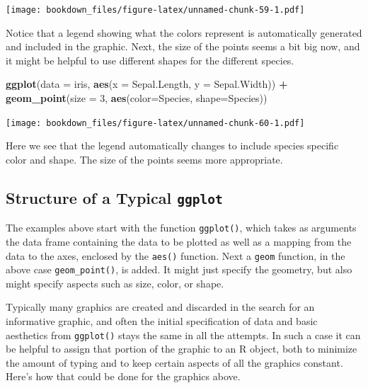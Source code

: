 \documentclass[
]{krantz}
\makeatletter
\newenvironment{Shaded}{\begin{snugshade}}{\end{snugshade}}
\newcommand{\DataTypeTok}[1]{\textcolor[rgb]{0.27,0.27,0.27}{#1}}
\newcommand{\DecValTok}[1]{\textcolor[rgb]{0.06,0.06,0.06}{#1}}
\newcommand{\KeywordTok}[1]{\textcolor[rgb]{0.27,0.27,0.27}{\textbf{#1}}}
\newcommand{\NormalTok}[1]{#1}
\newcommand{\OperatorTok}[1]{\textcolor[rgb]{0.43,0.43,0.43}{\textbf{#1}}}
\newcommand{\StringTok}[1]{\textcolor[rgb]{0.5,0.5,0.5}{#1}}
\newenvironment{kframe}{%
\medskip{}
\setlength{\fboxsep}{.8em}
 \def\at@end@of@kframe{}%
 \ifinner\ifhmode%
  \def\at@end@of@kframe{\end{minipage}}%
  \begin{minipage}{\columnwidth}%
 \fi\fi%
 \def\FrameCommand##1{\hskip\@totalleftmargin \hskip-\fboxsep
 \colorbox{shadecolor}{##1}\hskip-\fboxsep
     \hskip-\linewidth \hskip-\@totalleftmargin \hskip\columnwidth}%
 \MakeFramed {\advance\hsize-\width
   \@totalleftmargin\z@ \linewidth\hsize
   \@setminipage}}%
 {\par\unskip\endMakeFramed%
 \at@end@of@kframe}
\renewenvironment{Shaded}{\begin{kframe}}{\end{kframe}}
\makeatother
\begin{document}
\texttt{[image: bookdown\_files/figure-latex/unnamed-chunk-59-1.pdf]}

Notice that a legend showing what the colors represent is automatically generated and included in the graphic. Next, the size of the points seems a bit big now, and it might be helpful to use different shapes for the different species.

\begin{Shaded}
\begin{Highlighting}[]
\KeywordTok{ggplot}\NormalTok{(}\DataTypeTok{data =}\NormalTok{ iris, }\KeywordTok{aes}\NormalTok{(}\DataTypeTok{x =}\NormalTok{ Sepal.Length, }\DataTypeTok{y =}\NormalTok{ Sepal.Width)) }\OperatorTok{+}\StringTok{ }
\StringTok{    }\KeywordTok{geom\_point}\NormalTok{(}\DataTypeTok{size =} \DecValTok{3}\NormalTok{, }\KeywordTok{aes}\NormalTok{(}\DataTypeTok{color=}\NormalTok{Species, }\DataTypeTok{shape=}\NormalTok{Species))}
\end{Highlighting}
\end{Shaded}

\texttt{[image: bookdown\_files/figure-latex/unnamed-chunk-60-1.pdf]}

Here we see that the legend automatically changes to include species specific color and shape. The size of the points seems more appropriate.

\hypertarget{structure-of-a-typical-ggplot}{%
\subsection{\texorpdfstring{Structure of a Typical \texttt{ggplot}}{Structure of a Typical ggplot}}\label{structure-of-a-typical-ggplot}}

The examples above start with the function \texttt{ggplot()}, which takes as arguments the data frame containing the data to be plotted as well as a mapping from the data to the axes, enclosed by the \texttt{aes()} function. Next a \texttt{geom} function, in the above case \texttt{geom\_point()}, is added. It might just specify the geometry, but also might specify aspects such as size, color, or shape.

Typically many graphics are created and discarded in the search for an informative graphic, and often the initial specification of data and basic aesthetics from \texttt{ggplot()} stays the same in all the attempts. In such a case it can be helpful to assign that portion of the graphic to an R object, both to minimize the amount of typing and to keep certain aspects of all the graphics constant. Here's how that could be done for the graphics above.
\end{document}
